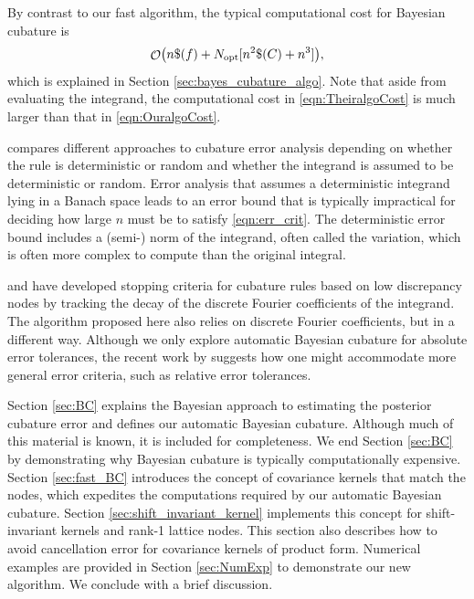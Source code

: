 \documentclass{svjour3}                     %
\DeclareMathOperator{\Order}{{\mathcal O}}
\newcommand{\opt}{{\textup{opt}}}
\begin{document}
By contrast to our fast algorithm, the typical computational cost for Bayesian cubature is
\begin{equation} \label{eqn:TheiralgoCost}
    \Order\bigl(n \$(f) + N_{\opt}[n^2\$(C) + n^3] \bigr),
\end{equation} 
which is explained in Section \ref{sec:bayes_cubature_algo}. Note that aside from evaluating the integrand, the computational cost in \eqref{eqn:TheiralgoCost} is much larger than that in \eqref{eqn:OuralgoCost}.  

\cite{Hic17a} compares different approaches to cubature error analysis depending on whether the rule is deterministic or random and whether the integrand is assumed to be deterministic or random.  Error analysis that assumes a deterministic integrand lying in a Banach space leads to an error bound that is typically impractical for deciding how large $n$ must be to satisfy \eqref{eqn:err_crit}.  The deterministic error bound includes a (semi-) norm of the integrand, often called the variation, which is often more complex to compute than the original integral.

\cite{HicJim16a} and \cite{JimHic16a} have developed stopping criteria for cubature rules based on low discrepancy nodes by tracking the decay of the discrete Fourier coefficients of the integrand.  The algorithm proposed here also relies on discrete Fourier coefficients, but in a different way.  Although we only explore automatic Bayesian cubature for absolute error tolerances, the recent work by \cite{HicEtal17a} suggests how one might accommodate more general error criteria, such as relative error tolerances.

Section \ref{sec:BC} explains the Bayesian approach to estimating the posterior cubature error and defines our automatic Bayesian cubature. Although much of this material is known, it is included for completeness.  We end Section \ref{sec:BC}  by demonstrating why Bayesian cubature is typically computationally expensive.
Section \ref{sec:fast_BC}  introduces the concept of covariance kernels that match the nodes, which expedites the computations required by our automatic Bayesian cubature. 
Section \ref{sec:shift_invariant_kernel} implements this concept for shift-invariant kernels and rank-1 lattice nodes.  This section also describes how to avoid cancellation error for covariance kernels of product form.  Numerical examples are provided in Section \ref{sec:NumExp} to demonstrate our new algorithm.  We conclude with a brief discussion.
\end{document}
